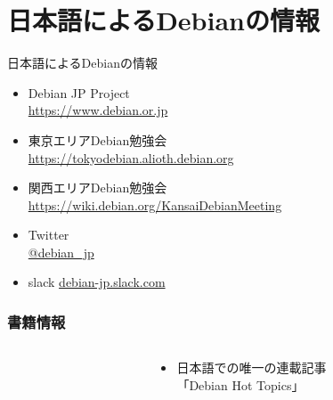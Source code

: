 \documentclass[cjk,c,squeeze,shrink,dvipdfmx,12pt]{beamer}
\begin{document}


\section{日本語によるDebianの情報}

\begin{frame}[fragile]{日本語によるDebianの情報}
  \begin{itemize}
  \item Debian JP Project \\
    \url{https://www.debian.or.jp}
  \item 東京エリアDebian勉強会\\
    \url{https://tokyodebian.alioth.debian.org}
  \item 関西エリアDebian勉強会 \\
    \url{https://wiki.debian.org/KansaiDebianMeeting}
  \item Twitter \\
    \url{@debian_jp}
  \item slack
    \url{debian-jp.slack.com}
  \end{itemize}
\end{frame}

\begin{frame}
  \frametitle{書籍情報}
  \begin{columns}
    \begin{column}{.5\paperwidth}
      \centering
    \end{column}
    \begin{column}{.5\paperwidth}
      \begin{itemize}
      \item %
        日本語での唯一の連載記事 \\
        「Debian Hot Topics」
      \end{itemize}
    \end{column}
  \end{columns}
\end{frame}
\end{document}
